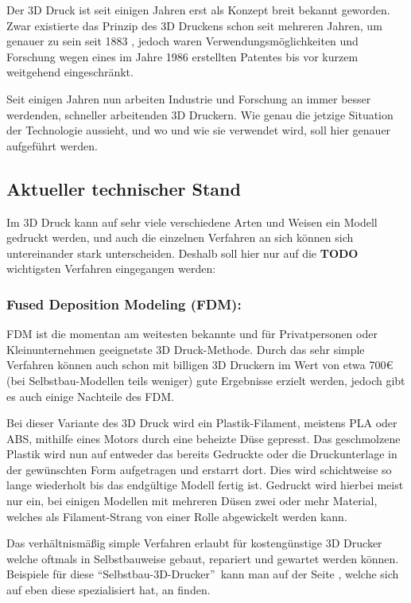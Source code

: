 
Der 3D Druck ist seit einigen Jahren erst als Konzept breit bekannt geworden.
Zwar existierte das Prinzip des 3D Druckens schon seit mehreren Jahren, um genauer zu sein seit 1883 \parencite{CHUCK}, jedoch waren Verwendungsmöglichkeiten und Forschung wegen eines im Jahre 1986 erstellten Patentes bis vor kurzem weitgehend eingeschränkt.

Seit einigen Jahren nun arbeiten Industrie und Forschung an immer besser werdenden, schneller arbeitenden 3D Druckern. Wie genau die jetzige Situation der Technologie aussieht, und wo und wie sie verwendet wird, soll hier genauer aufgeführt werden.

\subsection{Aktueller technischer Stand}

Im 3D Druck kann auf sehr viele verschiedene Arten und Weisen ein Modell gedruckt werden, und auch die einzelnen Verfahren an sich können sich untereinander stark unterscheiden.
Deshalb soll hier nur auf die \textbf{TODO} wichtigsten Verfahren eingegangen werden:

\subsubsection{Fused Deposition Modeling (FDM):}

FDM ist die momentan am weitesten bekannte und für Privatpersonen oder Kleinunternehmen geeignetste 3D Druck-Methode. Durch das sehr simple Verfahren können auch schon mit billigen 3D Druckern im Wert von etwa 700\euro~ (bei Selbstbau-Modellen teils weniger) gute Ergebnisse erzielt werden, jedoch gibt es auch einige Nachteile des FDM.

Bei dieser Variante des 3D Druck wird ein Plastik-Filament, meistens PLA oder ABS, mithilfe eines Motors durch eine beheizte Düse gepresst. Das geschmolzene Plastik wird nun auf entweder das bereits Gedruckte oder die Druckunterlage in der gewünschten Form aufgetragen und erstarrt dort.
Dies wird schichtweise so lange wiederholt bis das endgültige Modell fertig ist. Gedruckt wird hierbei meist nur ein, bei einigen Modellen mit mehreren Düsen zwei oder mehr Material, welches als Filament-Strang von einer Rolle abgewickelt werden kann.

Das verhältnismäßig simple Verfahren erlaubt für kostengünstige 3D Drucker welche oftmals in Selbstbauweise gebaut, repariert und gewartet werden können. Beispiele für diese \textquotedblleft Selbstbau-3D-Drucker\textquotedblright~kann man auf der Seite , welche sich auf eben diese spezialisiert hat, an finden.

